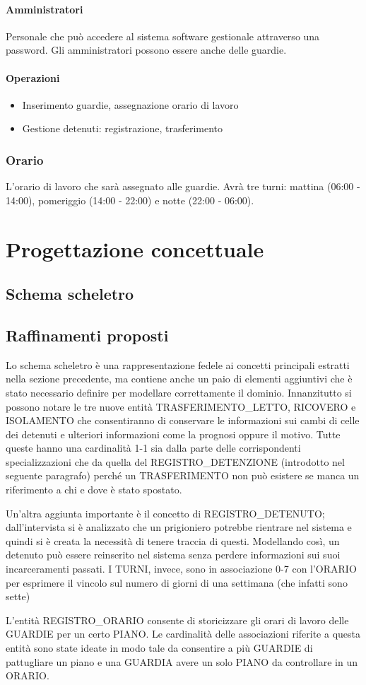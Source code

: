 \documentclass[a4paper,12pt]{report}
\begin{document}
\subsubsection*{Amministratori}
Personale che può accedere al sistema software gestionale attraverso una password.
%
Gli amministratori possono essere anche delle guardie.
\subsubsection*{Operazioni}
\begin{itemize}
    \item Inserimento guardie, assegnazione orario di lavoro
    \item Gestione detenuti: registrazione, trasferimento
\end{itemize}
\subsection*{Orario}
L'orario di lavoro che sarà assegnato alle guardie.
%
Avrà tre turni: mattina (06:00 - 14:00), pomeriggio (14:00 - 22:00) e notte (22:00 - 06:00).
\chapter{Progettazione concettuale}
\section{Schema scheletro}
\section{Raffinamenti proposti}
Lo schema scheletro è una rappresentazione fedele ai concetti principali estratti nella sezione precedente, ma contiene anche un paio di elementi aggiuntivi che è stato necessario definire per modellare correttamente il dominio.
%
Innanzitutto si possono notare le tre nuove entità TRASFERIMENTO\_LETTO, RICOVERO e ISOLAMENTO che consentiranno di conservare le informazioni sui cambi di celle dei detenuti e ulteriori informazioni come la prognosi oppure il motivo.
%
Tutte queste hanno una cardinalità 1-1 sia dalla parte delle corrispondenti specializzazioni che da quella del REGISTRO\_DETENZIONE (introdotto nel seguente paragrafo) perché un TRASFERIMENTO non può esistere se manca un riferimento a chi e dove è stato spostato.
%
\par
Un'altra aggiunta importante è il concetto di REGISTRO\_DETENUTO; dall'intervista si è analizzato che un prigioniero potrebbe rientrare nel sistema e quindi si è creata la necessità di tenere traccia di questi.
%
Modellando così, un detenuto può essere reinserito nel sistema senza perdere informazioni sui suoi incarceramenti passati.
%
I TURNI, invece, sono in associazione 0-7 con l'ORARIO per esprimere il vincolo sul numero di giorni di una settimana (che infatti sono sette)
%
\par
L'entità REGISTRO\_ORARIO consente di storicizzare gli orari di lavoro delle GUARDIE per un certo PIANO.
%
Le cardinalità delle associazioni riferite a questa entità sono state ideate in modo tale da consentire a più GUARDIE di pattugliare un piano e una GUARDIA avere un solo PIANO da controllare in un ORARIO.
\end{document}
